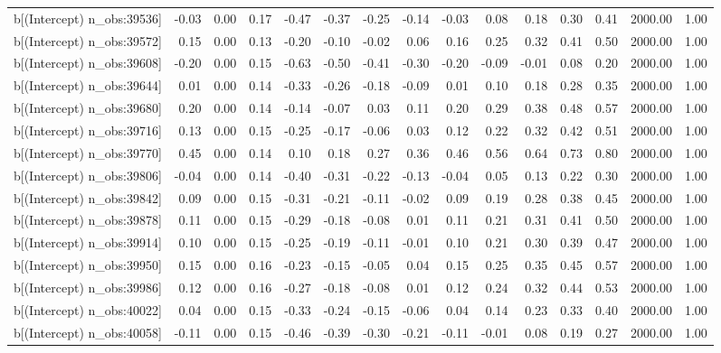 \begin{table}[ht]
\begin{tabular}{rrrrrrrrrrrrrrr}
  b[(Intercept) n\_obs:39536] & -0.03 & 0.00 & 0.17 & -0.47 & -0.37 & -0.25 & -0.14 & -0.03 & 0.08 & 0.18 & 0.30 & 0.41 & 2000.00 & 1.00 \\ 
  b[(Intercept) n\_obs:39572] & 0.15 & 0.00 & 0.13 & -0.20 & -0.10 & -0.02 & 0.06 & 0.16 & 0.25 & 0.32 & 0.41 & 0.50 & 2000.00 & 1.00 \\ 
  b[(Intercept) n\_obs:39608] & -0.20 & 0.00 & 0.15 & -0.63 & -0.50 & -0.41 & -0.30 & -0.20 & -0.09 & -0.01 & 0.08 & 0.20 & 2000.00 & 1.00 \\ 
  b[(Intercept) n\_obs:39644] & 0.01 & 0.00 & 0.14 & -0.33 & -0.26 & -0.18 & -0.09 & 0.01 & 0.10 & 0.18 & 0.28 & 0.35 & 2000.00 & 1.00 \\ 
  b[(Intercept) n\_obs:39680] & 0.20 & 0.00 & 0.14 & -0.14 & -0.07 & 0.03 & 0.11 & 0.20 & 0.29 & 0.38 & 0.48 & 0.57 & 2000.00 & 1.00 \\ 
  b[(Intercept) n\_obs:39716] & 0.13 & 0.00 & 0.15 & -0.25 & -0.17 & -0.06 & 0.03 & 0.12 & 0.22 & 0.32 & 0.42 & 0.51 & 2000.00 & 1.00 \\ 
  b[(Intercept) n\_obs:39770] & 0.45 & 0.00 & 0.14 & 0.10 & 0.18 & 0.27 & 0.36 & 0.46 & 0.56 & 0.64 & 0.73 & 0.80 & 2000.00 & 1.00 \\ 
  b[(Intercept) n\_obs:39806] & -0.04 & 0.00 & 0.14 & -0.40 & -0.31 & -0.22 & -0.13 & -0.04 & 0.05 & 0.13 & 0.22 & 0.30 & 2000.00 & 1.00 \\ 
  b[(Intercept) n\_obs:39842] & 0.09 & 0.00 & 0.15 & -0.31 & -0.21 & -0.11 & -0.02 & 0.09 & 0.19 & 0.28 & 0.38 & 0.45 & 2000.00 & 1.00 \\ 
  b[(Intercept) n\_obs:39878] & 0.11 & 0.00 & 0.15 & -0.29 & -0.18 & -0.08 & 0.01 & 0.11 & 0.21 & 0.31 & 0.41 & 0.50 & 2000.00 & 1.00 \\ 
  b[(Intercept) n\_obs:39914] & 0.10 & 0.00 & 0.15 & -0.25 & -0.19 & -0.11 & -0.01 & 0.10 & 0.21 & 0.30 & 0.39 & 0.47 & 2000.00 & 1.00 \\ 
  b[(Intercept) n\_obs:39950] & 0.15 & 0.00 & 0.16 & -0.23 & -0.15 & -0.05 & 0.04 & 0.15 & 0.25 & 0.35 & 0.45 & 0.57 & 2000.00 & 1.00 \\ 
  b[(Intercept) n\_obs:39986] & 0.12 & 0.00 & 0.16 & -0.27 & -0.18 & -0.08 & 0.01 & 0.12 & 0.24 & 0.32 & 0.44 & 0.53 & 2000.00 & 1.00 \\ 
  b[(Intercept) n\_obs:40022] & 0.04 & 0.00 & 0.15 & -0.33 & -0.24 & -0.15 & -0.06 & 0.04 & 0.14 & 0.23 & 0.33 & 0.40 & 2000.00 & 1.00 \\ 
  b[(Intercept) n\_obs:40058] & -0.11 & 0.00 & 0.15 & -0.46 & -0.39 & -0.30 & -0.21 & -0.11 & -0.01 & 0.08 & 0.19 & 0.27 & 2000.00 & 1.00 \\ 

\end{tabular}
\end{table}
